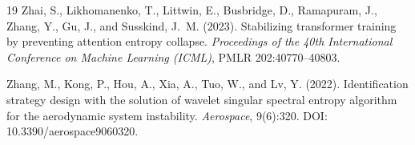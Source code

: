\documentclass[11pt,a4paper]{article}
\theoremstyle{plain}
\begin{document}
\begin{thebibliography}{19}
Zhai, S., Likhomanenko, T., Littwin, E., Busbridge, D., Ramapuram, J., Zhang, Y., Gu, J., and Susskind, J.~M. (2023).
Stabilizing transformer training by preventing attention entropy collapse.
\emph{Proceedings of the 40th International Conference on Machine Learning (ICML)}, PMLR 202:40770--40803.

Zhang, M., Kong, P., Hou, A., Xia, A., Tuo, W., and Lv, Y. (2022).
Identification strategy design with the solution of wavelet singular spectral entropy algorithm for the aerodynamic system instability.
\emph{Aerospace}, 9(6):320.
DOI: 10.3390/aerospace9060320.

\end{thebibliography}
\end{document}
